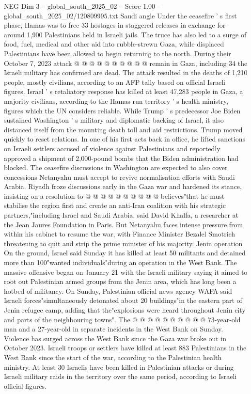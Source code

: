 \begin{textsample}{NEG Dim 3 – global\_south\_2025\_02 – Score 1.00 – global\_south\_2025\_02/120809995.txt}
Saudi angle Under the ceasefire ' s first phase, Hamas was to free 33 hostages in staggered releases in exchange for around 1,900 Palestinians held in Israeli jails.
The truce has also led to a surge of food, fuel, medical and other aid into rubble-strewn Gaza, while displaced Palestinians have been allowed to begin returning to the north.
During their October 7, 2023 attack @ @ @ @ @ @ @ @ @ @ remain in Gaza, including 34 the Israeli military has confirmed are dead.
The attack resulted in the deaths of 1,210 people, mostly civilians, according to an AFP tally based on official Israeli figures.
Israel ' s retaliatory response has killed at least 47,283 people in Gaza, a majority civilians, according to the Hamas-run territory ' s health ministry, figures which the UN considers reliable.
While Trump ' s predecessor Joe Biden sustained Washington ' s military and diplomatic backing of Israel, it also distanced itself from the mounting death toll and aid restrictions.
Trump moved quickly to reset relations.
In one of his first acts back in office, he lifted sanctions on Israeli settlers accused of violence against Palestinians and reportedly approved a shipment of 2,000-pound bombs that the Biden administration had blocked.
The ceasefire discussions in Washington are expected to also cover concessions Netanyahu must accept to revive normalisation efforts with Saudi Arabia.
Riyadh froze discussions early in the Gaza war and hardened its stance, insisting on a resolution to @ @ @ @ @ @ @ @ @ @ believes"that he must stabilise the region first and create an anti-Iran coalition with his strategic partners,"including Israel and Saudi Arabia, said David Khalfa, a researcher at the Jean Jaures Foundation in Paris.
But Netanyahu faces intense pressure from within his cabinet to resume the war, with Finance Minister Bezalel Smotrich threatening to quit and strip the prime minister of his majority.
Jenin operation On the ground, Israel said Sunday it has killed at least 50 militants and detained more than 100"wanted individuals"during an operation in the West Bank.
The massive offensive began on January 21 with the Israeli military saying it aimed to root out Palestinian armed groups from the Jenin area, which has long been a hotbed of militancy.
On Sunday, Palestinian official news agency WAFA said Israeli forces"simultaneously detonated about 20 buildings"in the eastern part of Jenin refugee camp, adding that the"explosions were heard throughout Jenin city and parts of the neighbouring towns".
The @ @ @ @ @ @ @ @ @ @ 73-year-old man and a 27-year-old in separate incidents in the West Bank on Sunday.
Violence has surged across the West Bank since the Gaza war broke out in October 2023.
Israeli troops or settlers have killed at least 883 Palestinians in the West Bank since the start of the war, according to the Palestinian health ministry.
At least 30 Israelis have been killed in Palestinian attacks or during Israeli military raids in the territory over the same period, according to Israeli official figures.

\end{textsample}
